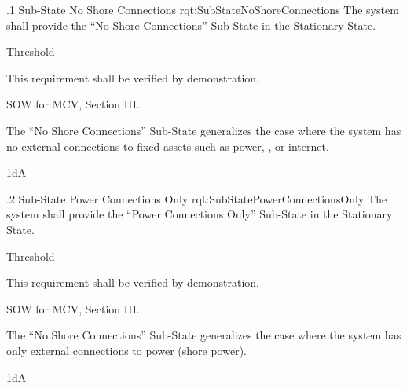 \ONERQMTVKSA
{\RqtNumberBase.1}
{Sub-State No Shore Connections}
{rqt:SubStateNoShoreConnections}
{The system shall provide the ``No Shore Connections'' Sub-State in the  Stationary State.}
{
	\item [Phase 1] Threshold
}
{This requirement shall be verified by demonstration.}
{
	\item [\cite{ref:MCV_SOW}] SOW for MCV, Section III.
}
{
	\item The ``No Shore Connections'' Sub-State generalizes the case where the system has no external connections to fixed assets such as power, \POTS, or internet.
}
{1dA}


\ONERQMTVKSA
{\RqtNumberBase.2}
{Sub-State Power Connections Only}
{rqt:SubStatePowerConnectionsOnly}
{The system shall provide the ``Power Connections Only'' Sub-State in the Stationary State.}
{
	\item [Phase 1] Threshold
}
{This requirement shall be verified by demonstration.}
{
	\item [\cite{ref:MCV_SOW}] SOW for MCV, Section III.
}
{
	\item The ``No Shore Connections'' Sub-State generalizes the case where the system has only external connections to power (shore power).
}
{1dA}


